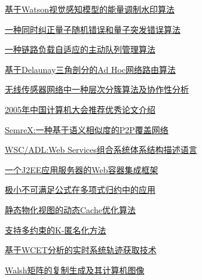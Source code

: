 \documentclass[a4paper]{article}
\begin{document}
\href{http://www.jos.org.cn/ch/reader/download_pdf.aspx?file_no=20060520&year_id=2006&quarter_id=5&falg=1}{基于Watson视觉感知模型的能量调制水印算法}

\href{http://www.jos.org.cn/ch/reader/download_pdf.aspx?file_no=20060521&year_id=2006&quarter_id=5&falg=1}{一种同时纠正量子随机错误和量子突发错误算法}

\href{http://www.jos.org.cn/ch/reader/download_pdf.aspx?file_no=20060522&year_id=2006&quarter_id=5&falg=1}{一种链路负载自适应的主动队列管理算法}

\href{http://www.jos.org.cn/ch/reader/download_pdf.aspx?file_no=20060523&year_id=2006&quarter_id=5&falg=1}{基于Delaunay三角剖分的Ad Hoc网络路由算法}

\href{http://www.jos.org.cn/ch/reader/download_pdf.aspx?file_no=20060524&year_id=2006&quarter_id=5&falg=1}{无线传感器网络中一种层次分簇算法及协作性分析}

\href{http://www.jos.org.cn/ch/reader/download_pdf.aspx?file_no=20060525&year_id=2006&quarter_id=5&falg=1}{2005年中国计算机大会推荐优秀论文介绍}

\href{http://www.jos.org.cn/ch/reader/download_pdf.aspx?file_no=20060526&year_id=2006&quarter_id=5&falg=1}{SemreX:一种基于语义相似度的P2P覆盖网络}

\href{http://www.jos.org.cn/ch/reader/download_pdf.aspx?file_no=20060527&year_id=2006&quarter_id=5&falg=1}{WSC/ADL:Web Services组合系统体系结构描述语言}

\href{http://www.jos.org.cn/ch/reader/download_pdf.aspx?file_no=20060528&year_id=2006&quarter_id=5&falg=1}{一个J2EE应用服务器的Web容器集成框架}

\href{http://www.jos.org.cn/ch/reader/download_pdf.aspx?file_no=20060529&year_id=2006&quarter_id=5&falg=1}{极小不可满足公式在多项式归约中的应用}

\href{http://www.jos.org.cn/ch/reader/download_pdf.aspx?file_no=20060530&year_id=2006&quarter_id=5&falg=1}{静态物化视图的动态Cache优化算法}

\href{http://www.jos.org.cn/ch/reader/download_pdf.aspx?file_no=20060531&year_id=2006&quarter_id=5&falg=1}{支持多约束的K-匿名化方法}

\href{http://www.jos.org.cn/ch/reader/download_pdf.aspx?file_no=20060532&year_id=2006&quarter_id=5&falg=1}{基于WCET分析的实时系统轨迹获取技术}

\href{http://www.jos.org.cn/ch/reader/download_pdf.aspx?file_no=20060533&year_id=2006&quarter_id=5&falg=1}{Walsh矩阵的复制生成及其计算机图像}
\end{document}

